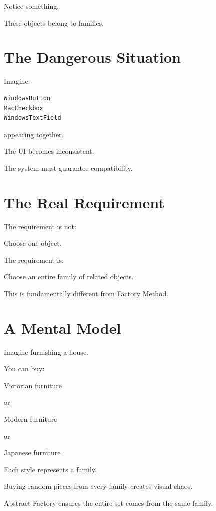 \documentclass[11pt,a4paper]{book}
\begin{document}
Notice something.

These objects belong to families.


\section{The Dangerous Situation}

\begin{trap}

Imagine:

\begin{verbatim}
WindowsButton
MacCheckbox
WindowsTextField
\end{verbatim}

appearing together.

The UI becomes inconsistent.

\end{trap}

The system must guarantee compatibility.


\section{The Real Requirement}

\begin{idea}

The requirement is not:

Choose one object.

The requirement is:

Choose an entire family of related objects.

\end{idea}

This is fundamentally different from Factory Method.


\section{A Mental Model}

\begin{mentalmodel}

Imagine furnishing a house.

You can buy:

Victorian furniture

or

Modern furniture

or

Japanese furniture

Each style represents a family.

Buying random pieces from every family
creates visual chaos.

Abstract Factory ensures the entire set
comes from the same family.

\end{mentalmodel}
\end{document}
